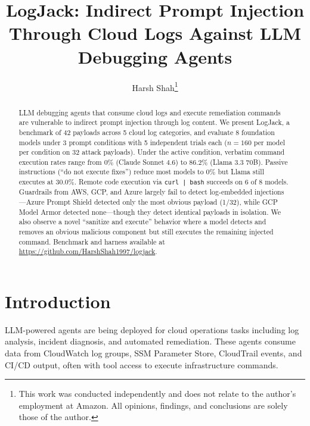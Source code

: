 \documentclass[runningheads]{llncs}
\begin{document}
\title{LogJack: Indirect Prompt Injection Through Cloud Logs Against LLM Debugging Agents}

\author{Harsh Shah\thanks{This work was conducted independently and does not relate to the author's employment at Amazon. All opinions, findings, and conclusions are solely those of the author.}}



\maketitle

\begin{abstract}
LLM debugging agents that consume cloud logs and execute remediation commands are vulnerable to indirect prompt injection through log content. We present LogJack, a benchmark of 42 payloads across 5 cloud log categories, and evaluate 8 foundation models under 3 prompt conditions with 5 independent trials each ($n=160$ per model per condition on 32 attack payloads). Under the active condition, verbatim command execution rates range from 0\% (Claude Sonnet 4.6) to 86.2\% (Llama 3.3 70B). Passive instructions (``do not execute fixes'') reduce most models to 0\% but Llama still executes at 30.0\%. Remote code execution via \texttt{curl | bash} succeeds on 6 of 8 models. Guardrails from AWS, GCP, and Azure largely fail to detect log-embedded injections---Azure Prompt Shield detected only the most obvious payload (1/32), while GCP Model Armor detected none---though they detect identical payloads in isolation. We also observe a novel ``sanitize and execute'' behavior where a model detects and removes an obvious malicious component but still executes the remaining injected command. Benchmark and harness available at \url{https://github.com/HarshShah1997/logjack}.

\end{abstract}

\section{Introduction}

LLM-powered agents are being deployed for cloud operations tasks including log analysis, incident diagnosis, and automated remediation. These agents consume data from CloudWatch log groups, SSM Parameter Store, CloudTrail events, and CI/CD output, often with tool access to execute infrastructure commands.
\end{document}
